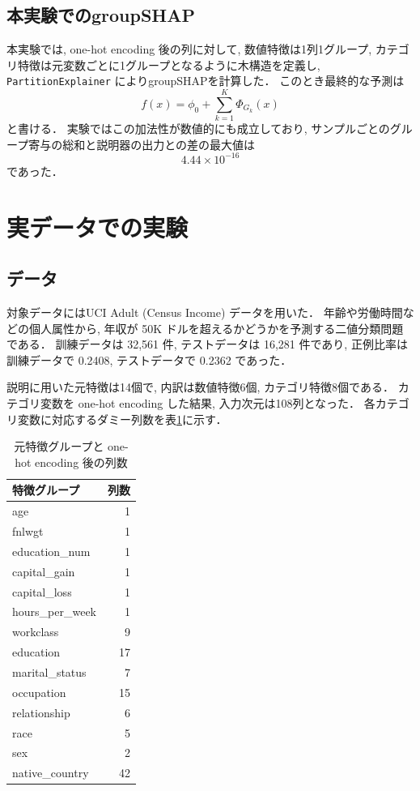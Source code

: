 \documentclass{article}
\begin{document}
\subsection{本実験でのgroupSHAP}
本実験では, one-hot encoding 後の列に対して, 数値特徴は1列1グループ, カテゴリ特徴は元変数ごとに1グループとなるように木構造を定義し, \texttt{PartitionExplainer} によりgroupSHAPを計算した．
このとき最終的な予測は
\[
f(x) = \phi_0 + \sum_{k=1}^{K}\Phi_{G_k}(x)
\]
と書ける．
実験ではこの加法性が数値的にも成立しており, サンプルごとのグループ寄与の総和と説明器の出力との差の最大値は
\[
4.44 \times 10^{-16}
\]
であった．

\section{実データでの実験}
\subsection{データ}
対象データにはUCI Adult (Census Income) データを用いた．
年齢や労働時間などの個人属性から, 年収が 50K ドルを超えるかどうかを予測する二値分類問題である．
訓練データは 32,561 件, テストデータは 16,281 件であり, 正例比率は訓練データで 0.2408, テストデータで 0.2362 であった．

説明に用いた元特徴は14個で, 内訳は数値特徴6個, カテゴリ特徴8個である．
カテゴリ変数を one-hot encoding した結果, 入力次元は108列となった．
各カテゴリ変数に対応するダミー列数を表\ref{tab:feature_groups}に示す．

\begin{table}[H]
    \centering
    \caption{元特徴グループと one-hot encoding 後の列数}
    \label{tab:feature_groups}
    \begin{tabular}{lr}
        \toprule
        特徴グループ & 列数 \\
        \midrule
        age & 1 \\
        fnlwgt & 1 \\
        education\_num & 1 \\
        capital\_gain & 1 \\
        capital\_loss & 1 \\
        hours\_per\_week & 1 \\
        workclass & 9 \\
        education & 17 \\
        marital\_status & 7 \\
        occupation & 15 \\
        relationship & 6 \\
        race & 5 \\
        sex & 2 \\
        native\_country & 42 \\
        \bottomrule
    \end{tabular}
\end{table}
\end{document}
